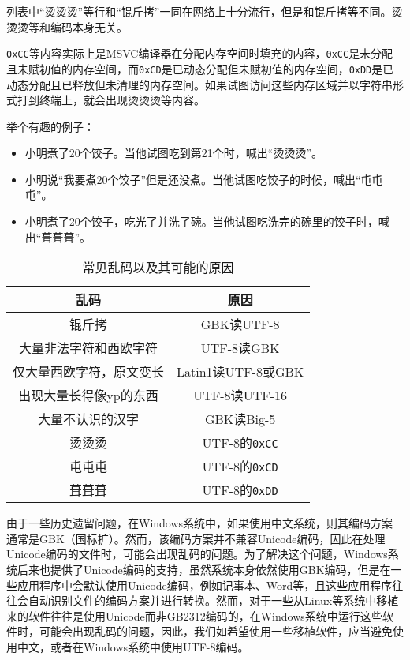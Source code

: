 \documentclass[../main.tex]{subfiles}
\begin{document}
\begin{note}
  列表中“烫烫烫”等行和“锟斤拷”一同在网络上十分流行，但是和锟斤拷等不同。烫烫烫等和编码本身无关。
  
  \texttt{0xCC}等内容实际上是MSVC编译器在分配内存空间时填充的内容，\texttt{0xCC}是未分配且未赋初值的内存空间，而\texttt{0xCD}是已动态分配但未赋初值的内存空间，\texttt{0xDD}是已动态分配且已释放但未清理的内存空间。如果试图访问这些内存区域并以字符串形式打到终端上，就会出现烫烫烫等内容。

  举个有趣的例子：
  \begin{itemize}
    \item 小明煮了20个饺子。当他试图吃到第21个时，喊出“烫烫烫”。
    \item 小明说“我要煮20个饺子”但是还没煮。当他试图吃饺子的时候，喊出“屯屯屯”。
    \item 小明煮了20个饺子，吃光了并洗了碗。当他试图吃洗完的碗里的饺子时，喊出“葺葺葺”。
  \end{itemize}
\end{note}

\begin{table}[ht]
  \centering
  \caption{常见乱码以及其可能的原因}
  \begin{tabular}{c|c}
    \toprule
    乱码 & 原因 \\
    \midrule
    锟斤拷 & GBK读UTF-8 \\
    大量非法字符和西欧字符 & UTF-8读GBK \\
    仅大量西欧字符，原文变长 & Latin1读UTF-8或GBK \\
    出现大量长得像yp的东西 & UTF-8读UTF-16 \\
    大量不认识的汉字 & GBK读Big-5 \\
    \midrule
    烫烫烫 & UTF-8的\texttt{0xCC}\\
    屯屯屯 & UTF-8的\texttt{0xCD}\\
    葺葺葺 & UTF-8的\texttt{0xDD}\\
    \bottomrule
  \end{tabular}
\end{table}

由于一些历史遗留问题，在Windows系统中，如果使用中文系统，则其编码方案通常是GBK（国标扩）。然而，该编码方案并不兼容Unicode编码，因此在处理Unicode编码的文件时，可能会出现乱码的问题。为了解决这个问题，Windows系统后来也提供了Unicode编码的支持，虽然系统本身依然使用GBK编码，但是在一些应用程序中会默认使用Unicode编码，例如记事本、Word等，且这些应用程序往往会自动识别文件的编码方案并进行转换。然而，对于一些从Linux等系统中移植来的软件往往是使用Unicode而非GB2312编码的，在Windows系统中运行这些软件时，可能会出现乱码的问题，因此，我们如希望使用一些移植软件，应当避免使用中文，或者在Windows系统中使用UTF-8编码。
\end{document}
